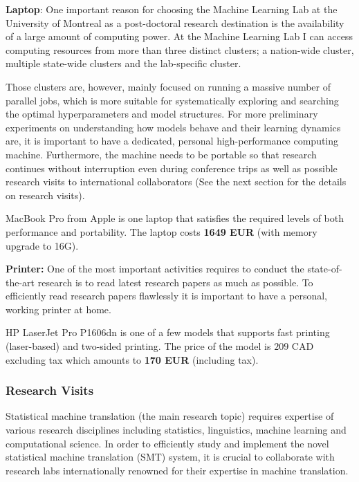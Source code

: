 \documentclass[11pt, oneside]{essay}
\begin{document}
\textbf{Laptop}: 
One important reason for choosing the Machine Learning Lab at the
University of Montreal as a post-doctoral research destination is
the availability of a large amount of computing power. At
the Machine Learning Lab I can access computing resources from
more than three distinct clusters; a nation-wide cluster,
multiple state-wide clusters and the lab-specific cluster.

Those clusters are, however, mainly focused on running a massive
number of parallel jobs, which is more suitable for
systematically exploring and searching the optimal
hyperparameters and model structures. For more preliminary
experiments on understanding how models behave and their learning
dynamics are, it is important to have a dedicated, personal
high-performance computing machine.  Furthermore, the machine
needs to be portable so that research continues without
interruption even during conference trips as well as possible
research visits to international collaborators (See the next
section for the details on research visits).

MacBook Pro from Apple is one laptop that satisfies the required
levels of both performance and portability. The laptop costs
\textbf{1649 EUR} (with memory upgrade to 16G).

\textbf{Printer:}
One of the most important activities requires to conduct the
state-of-the-art research is to read latest research papers as
much as possible. To efficiently read research papers flawlessly
it is important to have a personal, working printer at home. 

HP LaserJet Pro P1606dn is one of a few models that supports fast
printing (laser-based) and two-sided printing. The price of the
model is $209$ CAD excluding tax which amounts to \textbf{170
EUR} (including tax).



\subsubsection{Research Visits}

Statistical machine translation (the main research topic)
requires expertise of various research disciplines including
statistics, linguistics, machine learning and computational
science. In order to efficiently study and implement the novel
statistical machine translation (SMT) system, it is crucial to
collaborate with research labs internationally renowned for their
expertise in machine translation.
\end{document}
